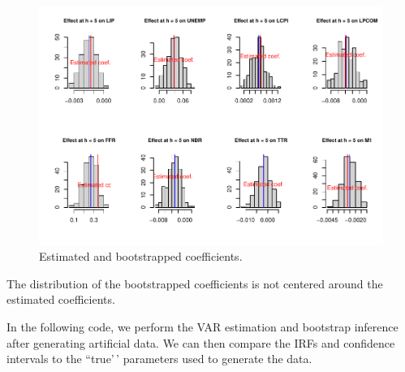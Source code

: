 \documentclass[
  12pt,
]{book}
\theoremstyle{definition}
\theoremstyle{definition}
\theoremstyle{definition}
\theoremstyle{definition}
\theoremstyle{remark}
\begin{document}
\begin{figure}
\includegraphics[width=0.95\linewidth]{IdentifStructShocks_files/figure-latex/inference3-1} \caption{Estimated and bootstrapped coefficients.}\label{fig:inference3}
\end{figure}

The distribution of the bootstrapped coefficients is not centered around the estimated coefficients.

In the following code, we perform the VAR estimation and bootstrap inference after generating artificial data. We can then compare the IRFs and confidence intervals to the ``true'\,' parameters used to generate the data.
\end{document}
